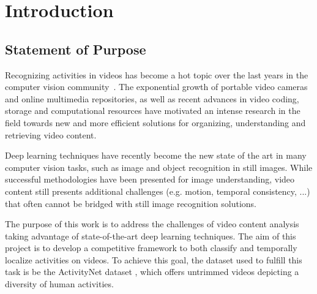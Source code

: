 \chapter{Introduction}

\section{Statement of Purpose}

Recognizing activities in videos has become a hot topic over the last years in the computer vision community~\cite{ngiam2011multimodal}. The exponential growth of portable video cameras and online multimedia repositories, as well as recent advances in video coding, storage and computational resources have motivated an intense research in the field towards new and more efficient solutions for organizing, understanding and retrieving video content.

Deep learning techniques have recently become the new state of the art in many computer vision tasks, such as image and object recognition in still images. While successful methodologies have been presented for image understanding, video content still presents additional challenges (e.g. motion, temporal consistency, ...)  that often cannot be bridged with still image recognition solutions.

The purpose of this work is to address the challenges of video content analysis taking advantage of state-of-the-art deep learning techniques. The aim of this project is to develop a competitive framework to both classify and temporally localize activities on videos. To achieve this goal, the dataset used to fulfill this task is be the ActivityNet dataset \cite{caba2015activitynet}, which offers untrimmed videos depicting a diversity of human activities.



